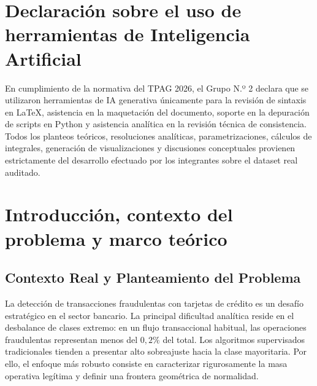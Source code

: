 \documentclass[12pt,a4paper]{article}
\begin{document}
\newpage

\section*{Declaración sobre el uso de herramientas de Inteligencia Artificial}
En cumplimiento de la normativa del TPAG 2026, el Grupo N.º 2 declara que se utilizaron herramientas de IA generativa únicamente para la revisión de sintaxis en LaTeX, asistencia en la maquetación del documento, soporte en la depuración de scripts en Python y asistencia analítica en la revisión técnica de consistencia. Todos los planteos teóricos, resoluciones analíticas, parametrizaciones, cálculos de integrales, generación de visualizaciones y discusiones conceptuales provienen estrictamente del desarrollo efectuado por los integrantes sobre el dataset real auditado.

\vspace{0.5cm}

\tableofcontents
\newpage

\section{Introducción, contexto del problema y marco teórico}

\subsection{Contexto Real y Planteamiento del Problema}
La detección de transacciones fraudulentas con tarjetas de crédito es un desafío estratégico en el sector bancario. La principal dificultad analítica reside en el desbalance de clases extremo: en un flujo transaccional habitual, las operaciones fraudulentas representan menos del $0{,}2\%$ del total. Los algoritmos supervisados tradicionales tienden a presentar alto sobreajuste hacia la clase mayoritaria. Por ello, el enfoque más robusto consiste en caracterizar rigurosamente la masa operativa legítima y definir una frontera geométrica de normalidad.
\end{document}
